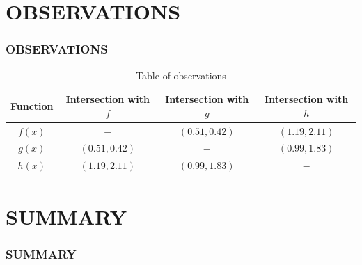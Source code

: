 \documentclass[11pt]{beamer}
\begin{document}
\section{OBSERVATIONS}
\begin{frame}\frametitle{OBSERVATIONS}

\begin{table}[h]
\centering
\begin{tabular}{c|c|c|c}
Function&Intersection with $f$&Intersection with $g$&Intersection with $h$\\
\hline
\hline
$f(x)$&$-$&$(0.51,0.42)$&$(1.19,2.11)$\\
\hline
$g(x)$&$(0.51,0.42)$&$-$&$(0.99,1.83)$\\
\hline
$h(x)$&$(1.19,2.11)$&$(0.99,1.83)$&$-$\\
\hline

\end{tabular}
\caption{Table of observations}
\end{table}

\end{frame}

\section{SUMMARY}
\begin{frame}\frametitle{SUMMARY}

\hyperlink{1}{}\\
\hyperlink{2}{}\\
\hyperlink{3}{}\\
\hyperlink{4}{}

\end{frame}
\end{document}
